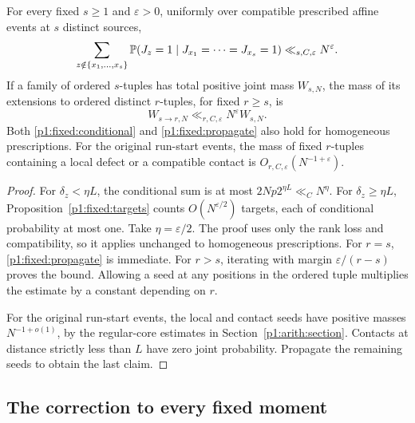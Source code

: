 \begin{proposition}
\label{p1:fixed:propagation}
For every fixed \(s\ge1\) and \(\varepsilon>0\), uniformly
over compatible prescribed affine events at \(s\) distinct
sources,
\begin{equation}
 \sum_{z\notin\{x_1,\ldots,x_s\}}
 \P(J_z=1\mid J_{x_1}=\cdots=J_{x_s}=1)
       \ll_{s,C,\varepsilon}N^\varepsilon .
 \label{p1:fixed:conditional}
\end{equation}
If a family of ordered \(s\)-tuples has total positive joint mass \(W_{s,N}\),
the mass of its extensions to ordered distinct \(r\)-tuples,
for fixed \(r\ge s\), is
\begin{equation}
 W_{s\to r,N}\ll_{r,C,\varepsilon}N^\varepsilon W_{s,N}.
 \label{p1:fixed:propagate}
\end{equation}
Both \eqref{p1:fixed:conditional} and \eqref{p1:fixed:propagate}
also hold for homogeneous prescriptions.
For the original run-start events, the mass of fixed \(r\)-tuples
containing a local defect or a compatible contact is
\(O_{r,C,\varepsilon}(N^{-1+\varepsilon})\).
\end{proposition}

\begin{proof}
For \(\delta_z<\eta L\), the conditional sum is at most
\(2Np2^{\eta L}\ll_C N^\eta\). For
\(\delta_z\ge\eta L\), Proposition~\ref{p1:fixed:targets}
counts \(O(N^{\varepsilon/2})\) targets, each of conditional
probability at most one. Take \(\eta=\varepsilon/2\).
The proof uses only the rank loss and compatibility, so
it applies unchanged to homogeneous prescriptions.
For \(r=s\), \eqref{p1:fixed:propagate} is immediate.
For \(r>s\), iterating with margin \(\varepsilon/(r-s)\)
proves the bound. Allowing a seed at any positions
in the ordered tuple multiplies the estimate by a constant
depending on \(r\).

For the original run-start events, the local and contact seeds have positive masses
\(N^{-1+o(1)}\), by the regular-core estimates in
Section~\ref{p1:arith:section}. Contacts at distance
strictly less than \(L\) have zero joint probability.
Propagate the remaining seeds to obtain the last claim.
\end{proof}

\subsection{The correction to every fixed moment}


